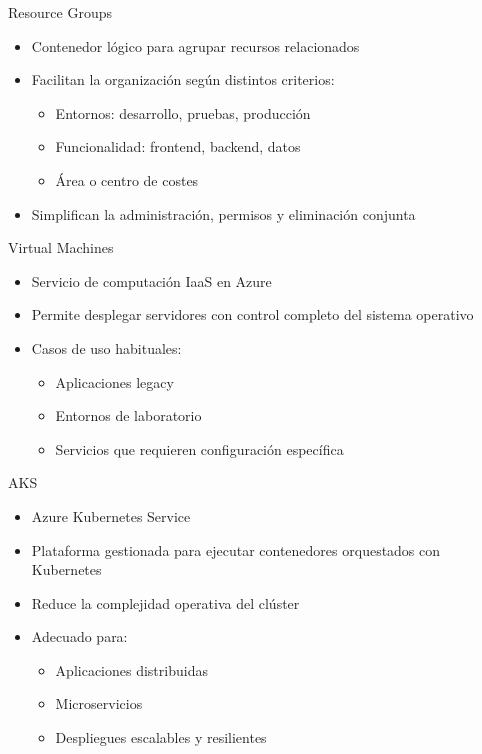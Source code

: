 \documentclass{beamer}
\begin{document}
\begin{frame}{Resource Groups}
\begin{itemize}
    \item Contenedor lógico para agrupar recursos relacionados
    \item Facilitan la organización según distintos criterios:
    \begin{itemize}
        \item Entornos: desarrollo, pruebas, producción
        \item Funcionalidad: frontend, backend, datos
        \item Área o centro de costes
    \end{itemize}
    \item Simplifican la administración, permisos y eliminación conjunta
\end{itemize}
\end{frame}

\begin{frame}{Virtual Machines}
\begin{itemize}
    \item Servicio de computación IaaS en Azure
    \item Permite desplegar servidores con control completo del sistema operativo
    \item Casos de uso habituales:
    \begin{itemize}
        \item Aplicaciones legacy
        \item Entornos de laboratorio
        \item Servicios que requieren configuración específica
    \end{itemize}
\end{itemize}
\end{frame}

\begin{frame}{AKS}
\begin{itemize}
    \item Azure Kubernetes Service
    \item Plataforma gestionada para ejecutar contenedores orquestados con Kubernetes
    \item Reduce la complejidad operativa del clúster
    \item Adecuado para:
    \begin{itemize}
        \item Aplicaciones distribuidas
        \item Microservicios
        \item Despliegues escalables y resilientes
    \end{itemize}
\end{itemize}
\end{frame}
\end{document}
